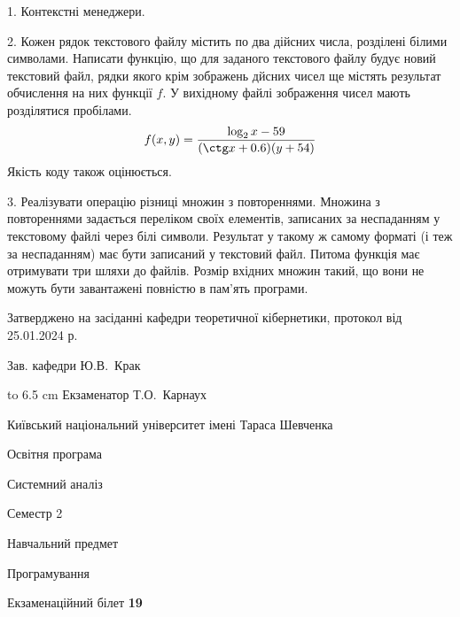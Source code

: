 \documentclass[12pt, ukrainian]{article}
\begin{document}
{%
1. Контекстні менеджери.%
\par
\vspace{2mm}

2. Кожен рядок текстового файлу містить по два дійсних числа, розділені білими символами.
Написати функцію, що для заданого текстового файлу будує новий текстовий файл, рядки якого крім зображень дйсних чисел ще містять результат обчислення на них функції $f$. У вихідному файлі зображення чисел мають розділятися пробілами. 
$$f(x, y) =\frac{\log_{2} x - 59}{(\ctg x + 0.6) (y + 54)}$$ 
Якість коду також оцінюється.

\par
\vspace{2mm}

3. Реалізувати операцію різниці множин з повтореннями. Множина з повтореннями задається переліком своїх елементів, записаних за неспаданням у текстовому файлі через білі символи. Результат у такому ж самому форматі (і теж за неспаданням) має бути записаний у текстовий файл. Питома функція має отримувати три шляхи до файлів. Розмір вхідних множин такий, що вони не можуть бути завантажені повністю в пам’ять програми.

}
{\smallskip\smallskip \begin {scriptsize} Затверджено на засіданні кафедри теоретичної кібернетики, протокол   від   25.01.2024 р.\par\smallskip\smallskip\smallskip\smallskip
{\parbox {6.5 cm} {Зав. кафедри \dotfill Ю.В.~Крак}}\hspace {0.7cm} {\hbox to 6.5 cm { Екзаменатор \dotfill Т.О.~Карнаух}} \end{scriptsize}}
\newpage
{{\begin {scriptsize}\par
{ \center  Київський національний університет імені Тараса Шевченка \par}
{\parbox {5 cm}{Освітня програма \hfill}{\parbox {7 cm}{Системний аналіз\hfill}}\parbox {6 cm}{\hfill Семестр 2}}\par
{\parbox {5 cm} {Навчальний предмет \hfill}\parbox {7 cm}{Програмування \hfill}\parbox {6cm}{\hfill}\par}\vspace{-15pt} \end{scriptsize}}{\center Екзаменаційний білет \No \textbf { 19 }\par}}
\end{document}
